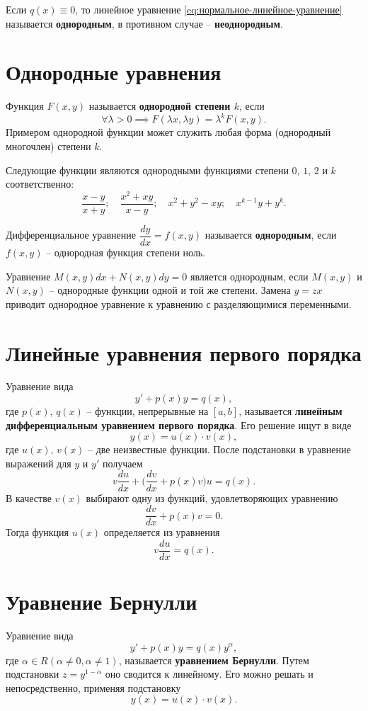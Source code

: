 \documentclass[a5paper, 11pt]{extbook}
\theoremstyle{definition}
\theoremstyle{definition}
\begin{document}
Если \(q(x) \equiv 0\), то линейное уравнение \eqref{eq:нормальное-линейное-уравнение} называется \textbf{однородным}, в противном случае -- \textbf{неоднородным}.

\section{Однородные уравнения}

Функция \(F(x, y)\) называется \textbf{однородной степени \(k\)}, если
\[
    \forall \lambda > 0 \implies F(\lambda x, \lambda y) = \lambda^k F(x, y).
\]
Примером однородной функции может служить любая форма (однородный многочлен) степени \(k\).

Следующие функции являются однородными функциями степени \(0\), \(1\), \(2\) и \(k\) соответственно:
\[
    \frac{x - y}{x + y};
    \quad
    \frac{x^2 + xy}{x - y};
    \quad
    x^2 + y^2 - xy;
    \quad
    x^{k - 1}y + y^k.
\]

Дифференциальное уравнение \(\dfrac{dy}{dx} = f(x, y)\) называется \textbf{однородным}, если \(f(x, y)\) -- однородная функция степени ноль.

Уравнение \(M(x, y)dx + N(x, y)dy = 0\) является однородным, если \(M(x, y)\) и \(N(x, y)\) -- однородные функции одной и той же степени. Замена \(y = zx\) приводит однородное уравнение к уравнению с разделяющимися переменными.

\section{Линейные уравнения первого порядка}

Уравнение вида
\[
    y' + p(x)y = q(x),
\]
где \(p(x)\), \(q(x)\) -- функции, непрерывные на \([a, b]\), называется \textbf{линейным дифференциальным уравнением первого порядка}. Его решение ищут в виде
\[
    y(x) = u(x) \cdot v(x),
\]
где \(u(x)\), \(v(x)\) -- две неизвестные функции. После подстановки в уравнение выражений для \(y\) и \(y'\) получаем
\[
    v \frac{du}{dx} + \Big( \frac{dv}{dx} + p(x)v \Big) u = q(x).
\]
В качестве \(v(x)\) выбирают одну из функций, удовлетворяющих уравнению
\[
    \frac{dv}{dx} + p(x)v = 0.
\]
Тогда функция \(u(x)\) определяется из уравнения
\[
    v \frac{du}{dx} = q(x).
\]

\section{Уравнение Бернулли}

Уравнение вида
\[
    y' + p(x)y = q(x)y^\alpha,
\]
где \(\alpha \in R (\alpha \neq 0, \alpha \neq 1)\), называется \textbf{уравнением Бернулли}. Путем подстановки \(z = y^{1 - \alpha}\) оно сводится к линейному. Его можно решать и непосредственно, применяя подстановку
\[
    y(x) = u(x) \cdot v(x).
\]
\end{document}
